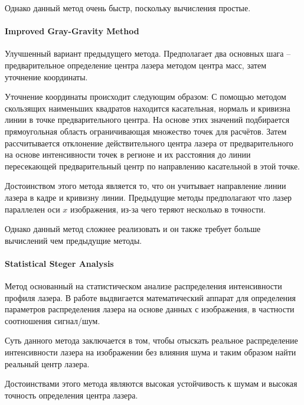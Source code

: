                 Однако данный метод очень быстр, поскольку вычисления простые.
                
            \paragraph{Improved Gray-Gravity Method}
                Улучшенный вариант предыдущего метода\cite{Li2017}. Предполагает два основных шага -- предварительное определение центра лазера методом центра масс, затем уточнение координаты.
                
                Уточнение координаты происходит следующим образом:
                С помощью методом скользящих наименьших квадратов находится касательная, нормаль и кривизна линии в точке предварительного центра. На основе этих значений подбирается прямоугольная область ограничивающая множество точек для расчётов. Затем рассчитывается отклонение действительного центра лазера от предварительного на основе интенсивности точек в регионе и их расстояния до линии пересекающей предварительный центр по направлению касательной в этой точке.
                
                Достоинством этого метода является то, что он учитывает направление линии лазера в кадре и кривизну линии. Предыдущие методы предполагают что лазер параллелен оси $ x $ изображения, из-за чего теряют несколько в точности.
                
                Однако данный метод сложнее реализовать и он также требует больше вычислений чем предыдущие методы.
                
            \paragraph{Statistical Steger Analysis}
                Метод основанный на статистическом анализе распределения интенсивности профиля лазера. В работе \cite{Qi2013} выдвигается математический аппарат для определения параметров распределения лазера на основе данных с изображения, в частности соотношения сигнал/шум.
                
                Суть данного метода заключается в том, чтобы отыскать реальное распределение интенсивности лазера на изображении без влияния шума и таким образом найти реальный центр лазера.
                
                Достоинствами этого метода являются высокая устойчивость к шумам и высокая точность определения центра лазера.
                

